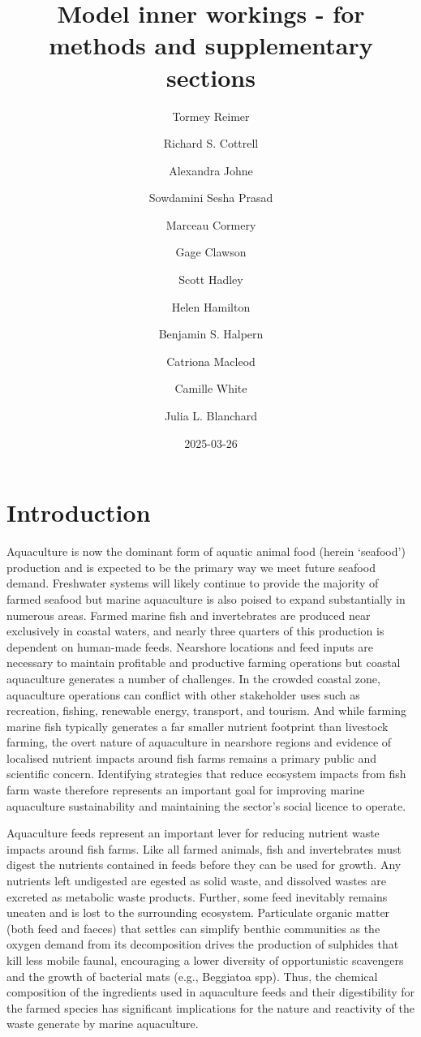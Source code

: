 \documentclass[
  a4paper,
]{article}
\title{Model inner workings - for methods and supplementary sections}
\author[12]{Tormey Reimer}
\author{Richard S. Cottrell}
\author{Alexandra Johne}
\author{Sowdamini Sesha Prasad}
\author{Marceau Cormery}
\author{Gage Clawson}
\author{Scott Hadley}
\author{Helen Hamilton}
\author{Benjamin S. Halpern}
\author{Catriona Macleod}
\author{Camille White}
\author{Julia L. Blanchard}
\affil[1]{Institute for Marine and Antarctic Studies}
\affil[2]{Centre for Marine Socioecology}
\date{2025-03-26}
\begin{document}
\maketitle


\section{Introduction}\label{introduction}

Aquaculture is now the dominant form of aquatic animal food (herein
`seafood') production and is expected to be the primary way we meet
future seafood demand. Freshwater systems will likely continue to
provide the majority of farmed seafood but marine aquaculture is also
poised to expand substantially in numerous areas. Farmed marine fish and
invertebrates are produced near exclusively in coastal waters, and
nearly three quarters of this production is dependent on human-made
feeds. Nearshore locations and feed inputs are necessary to maintain
profitable and productive farming operations but coastal aquaculture
generates a number of challenges. In the crowded coastal zone,
aquaculture operations can conflict with other stakeholder uses such as
recreation, fishing, renewable energy, transport, and tourism. And while
farming marine fish typically generates a far smaller nutrient footprint
than livestock farming, the overt nature of aquaculture in nearshore
regions and evidence of localised nutrient impacts around fish farms
remains a primary public and scientific concern. Identifying strategies
that reduce ecosystem impacts from fish farm waste therefore represents
an important goal for improving marine aquaculture sustainability and
maintaining the sector's social licence to operate.

Aquaculture feeds represent an important lever for reducing nutrient
waste impacts around fish farms. Like all farmed animals, fish and
invertebrates must digest the nutrients contained in feeds before they
can be used for growth. Any nutrients left undigested are egested as
solid waste, and dissolved wastes are excreted as metabolic waste
products. Further, some feed inevitably remains uneaten and is lost to
the surrounding ecosystem. Particulate organic matter (both feed and
faeces) that settles can simplify benthic communities as the oxygen
demand from its decomposition drives the production of sulphides that
kill less mobile faunal, encouraging a lower diversity of opportunistic
scavengers and the growth of bacterial mats (e.g., Beggiatoa spp). Thus,
the chemical composition of the ingredients used in aquaculture feeds
and their digestibility for the farmed species has significant
implications for the nature and reactivity of the waste generate by
marine aquaculture.
\end{document}
